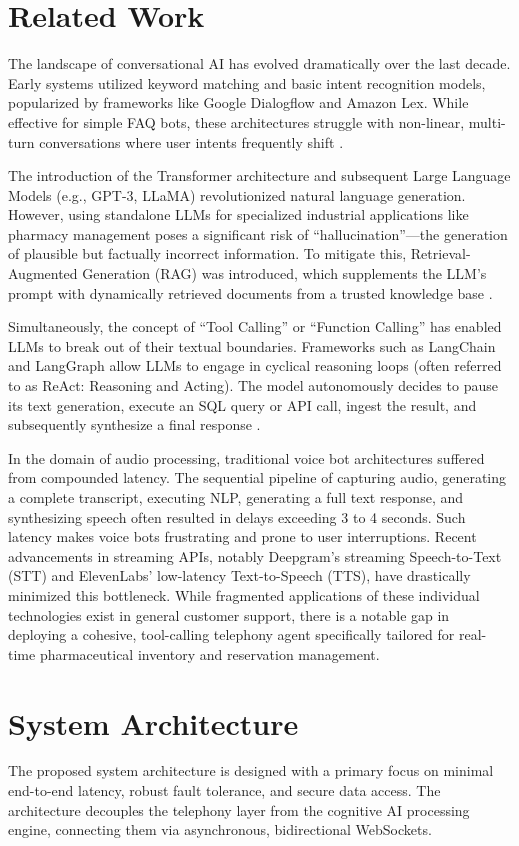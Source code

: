 \documentclass[conference,a4paper]{IEEEtran}
\begin{document}
\section{Related Work}
The landscape of conversational AI has evolved dramatically over the last decade. Early systems utilized keyword matching and basic intent recognition models, popularized by frameworks like Google Dialogflow and Amazon Lex. While effective for simple FAQ bots, these architectures struggle with non-linear, multi-turn conversations where user intents frequently shift \cite{langchain}.

The introduction of the Transformer architecture and subsequent Large Language Models (e.g., GPT-3, LLaMA) revolutionized natural language generation. However, using standalone LLMs for specialized industrial applications like pharmacy management poses a significant risk of ``hallucination''—the generation of plausible but factually incorrect information. To mitigate this, Retrieval-Augmented Generation (RAG) was introduced, which supplements the LLM's prompt with dynamically retrieved documents from a trusted knowledge base \cite{rag_paper}. 

Simultaneously, the concept of ``Tool Calling'' or ``Function Calling'' has enabled LLMs to break out of their textual boundaries. Frameworks such as LangChain and LangGraph allow LLMs to engage in cyclical reasoning loops (often referred to as ReAct: Reasoning and Acting). The model autonomously decides to pause its text generation, execute an SQL query or API call, ingest the result, and subsequently synthesize a final response \cite{langgraph}. 

In the domain of audio processing, traditional voice bot architectures suffered from compounded latency. The sequential pipeline of capturing audio, generating a complete transcript, executing NLP, generating a full text response, and synthesizing speech often resulted in delays exceeding 3 to 4 seconds. Such latency makes voice bots frustrating and prone to user interruptions. Recent advancements in streaming APIs, notably Deepgram's streaming Speech-to-Text (STT) and ElevenLabs' low-latency Text-to-Speech (TTS), have drastically minimized this bottleneck. While fragmented applications of these individual technologies exist in general customer support, there is a notable gap in deploying a cohesive, tool-calling telephony agent specifically tailored for real-time pharmaceutical inventory and reservation management.

\section{System Architecture}
The proposed system architecture is designed with a primary focus on minimal end-to-end latency, robust fault tolerance, and secure data access. The architecture decouples the telephony layer from the cognitive AI processing engine, connecting them via asynchronous, bidirectional WebSockets. 
\end{document}
